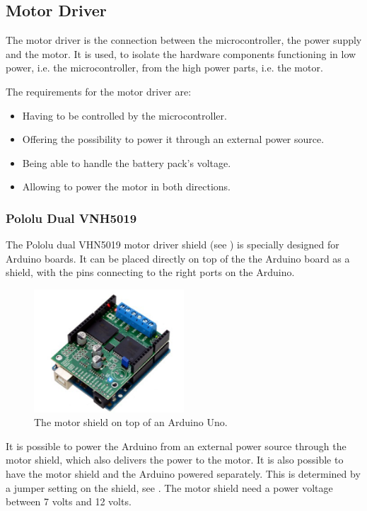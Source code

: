 \subsection{Motor Driver}
The motor driver is the connection between the microcontroller, the power supply and the motor. It is used, to isolate the hardware components functioning in low power, i.e. the microcontroller, from the high power parts, i.e. the motor.

The requirements for the motor driver are:
\begin{itemize}
\item Having to be controlled by the microcontroller.
\item Offering the possibility to power it through an external power source.
\item Being able to handle the battery pack's voltage.
\item Allowing to power the motor in both directions.
\end{itemize}

\subsubsection{Pololu Dual VNH5019}
The Pololu dual VHN5019 motor driver shield (see ) is specially designed for Arduino boards. It can be placed directly on top of the the Arduino board as a shield, with the pins connecting to the right ports on the Arduino.\cite{PCorporation}

\begin{figure}[H]
	\centering
	\includegraphics[width=0.50\textwidth]{figures/Motordriver.png}
		\caption{The motor shield on top of an Arduino Uno.} 
	\label{MotorDrive}
\end{figure}


It is possible to power the Arduino from an external power source through the motor shield, which also delivers the power to the motor. It is also possible to have the motor shield and the Arduino powered separately. This is determined by a jumper setting on the shield, see . The motor shield need a power voltage between 7 volts and 12 volts.\cite{PCorporation}

